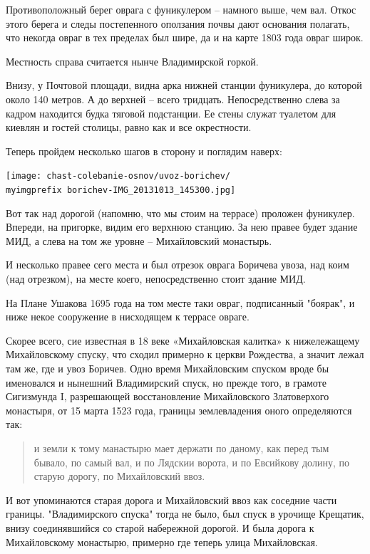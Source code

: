 Противоположный берег оврага с фуникулером – намного выше, чем вал. Откос этого берега и следы постепенного оползания почвы дают основания полагать, что некогда овраг в тех пределах был шире, да и на карте 1803 года овраг широк.

Местность справа считается нынче Владимирской горкой.

Внизу, у Почтовой площади, видна арка нижней станции фуникулера, до которой около 140 метров. А до верхней – всего тридцать. Непосредственно слева за кадром находится будка тяговой подстанции. Ее стены служат туалетом для киевлян и гостей столицы, равно как и все окрестности.

\newpage

Теперь пройдем несколько шагов в сторону и поглядим наверх:

\begin{center}
\texttt{[image: chast-colebanie-osnov/uvoz-borichev/\\myimgprefix borichev-IMG\_20131013\_145300.jpg]}
\end{center}

Вот так над дорогой (напомню, что мы стоим на террасе) проложен фуникулер. Впереди, на пригорке, видим его верхнюю станцию. За нею правее будет здание МИД, а слева на том же уровне – Михайловский монастырь.

И несколько правее сего места и был отрезок оврага Боричева увоза, над коим (над отрезком), на месте коего, непосредственно стоит здание МИД. 

На Плане Ушакова 1695 года на том месте таки овраг, подписанный "боярак", и ниже некое сооружение в нисходящем к террасе овраге. 

Скорее всего, сие известная в 18 веке «Михайловская калитка» к нижележащему Михайловскому спуску, что сходил примерно к церкви Рождества, а значит лежал там же, где и увоз Боричев. Одно время Михайловским спуском вроде бы именовался и нынешний Владимирский спуск, но прежде того, в грамоте Сигизмунда I, разрешающей восстановление Михайловского Златоверхого монастыря, от 15 марта 1523 года, границы землевладения оного определяются так:

\begin{quotation}
и земли к тому манастырю мает держати по даному, как перед тым бывало, по самый вал, и по Лядскии ворота, и по Евсийкову долину, по старую дорогу, по Михайловский ввоз.
\end{quotation} 

И вот упоминаются старая дорога и Михайловский ввоз как соседние части границы. "Владимирского спуска" тогда не было, был спуск в урочище Крещатик, внизу соединявшийся со старой набережной дорогой. 
И была дорога к Михайловскому монастырю, примерно где теперь улица Михайловская. 

